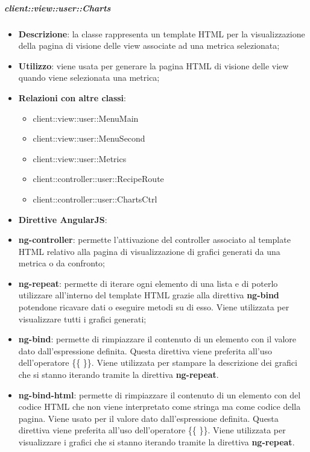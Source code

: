 		\subparagraph{client::view::user::Charts} %
		\label{subp:bdsm_app_client_view_user_charts}

			\begin{itemize}
				\item \textbf{Descrizione}: la classe rappresenta un template HTML per la visualizzazione della pagina di visione delle view associate ad una metrica selezionata;
				\item \textbf{Utilizzo}: viene usata per generare la pagina HTML di visione delle view quando viene selezionata una metrica;
				\item \textbf{Relazioni con altre classi}:
					\begin{itemize}
						\item client::view::user::MenuMain
						\item client::view::user::MenuSecond
						\item client::view::user::Metrics
						\item client::controller::user::RecipeRoute
						\item client::controller::user::ChartsCtrl
					\end{itemize}
				\item \textbf{Direttive AngularJS}:
						\item \textbf{ng-controller}: permette l'attivazione del controller associato al template HTML relativo alla pagina di visualizzazione di grafici generati da una metrica o da confronto;
						\item \textbf{ng-repeat}: permette di iterare ogni elemento di una lista e di poterlo utilizzare all'interno del template HTML grazie alla direttiva \textbf{ng-bind} potendone ricavare dati o eseguire metodi su di esso. Viene utilizzata per visualizzare tutti i grafici generati;
						\item \textbf{ng-bind}: permette di rimpiazzare il contenuto di un elemento con il valore dato dall'espressione definita. Questa direttiva viene preferita all'uso dell'operatore \{\{ \}\}. Viene utilizzata per stampare la descrizione dei grafici che si stanno iterando tramite la direttiva \textbf{ng-repeat}.
						\item \textbf{ng-bind-html}: permette di rimpiazzare il contenuto di un elemento con del codice HTML che non viene interpretato come stringa ma come codice della pagina. Viene usato per 
						il valore dato dall'espressione definita. Questa direttiva viene preferita all'uso dell'operatore \{\{ \}\}. Viene utilizzata per visualizzare i grafici che si stanno iterando tramite la direttiva \textbf{ng-repeat}.
			\end{itemize}

